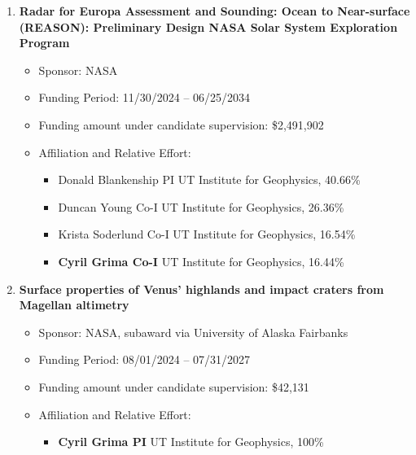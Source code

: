 \begin{enumerate}[leftmargin=2.5em, labelsep=1.5em, label=UR\arabic*]

    \item
        \textbf{Radar for Europa Assessment and Sounding: Ocean to Near-surface (REASON): Preliminary Design NASA Solar System Exploration Program}
        \begin{itemize}[leftmargin=0em, labelsep=1em, topsep=-.5em, itemsep=-.2em]
            \item Sponsor: NASA
            \item Funding Period: 11/30/2024 – 06/25/2034
            \item Funding amount under candidate supervision: \$2,491,902
            \item Affiliation and Relative Effort:
            \TabPositions{4cm, 5.5cm}
            \begin{itemize}[leftmargin=2em, labelsep=1em, topsep=-.5em, itemsep=-.2em]
                \item Donald Blankenship \tab PI \tab UT Institute for Geophysics, 40.66\%
                \item Duncan Young \tab Co-I \tab  UT Institute for Geophysics, 26.36\%
                \item Krista Soderlund \tab Co-I \tab  UT Institute for Geophysics, 16.54\% 
                \item \textbf{Cyril Grima \tab Co-I} \tab  UT Institute for Geophysics, 16.44\%
            \end{itemize}
        \end{itemize}

    \item
        \textbf{Surface properties of Venus' highlands and impact craters from Magellan altimetry}
        \begin{itemize}[leftmargin=0em, labelsep=1em, topsep=-.5em, itemsep=-.2em]
            \item Sponsor: NASA, subaward via University of Alaska Fairbanks
            \item Funding Period: 08/01/2024 – 07/31/2027
            \item Funding amount under candidate supervision: \$42,131
            \item Affiliation and Relative Effort:
            \TabPositions{4cm, 5.5cm}
            \begin{itemize}[leftmargin=2em, labelsep=1em, topsep=-.5em, itemsep=-.2em]
                \item \textbf{Cyril Grima \tab PI} \tab  UT Institute for Geophysics, 100\%
            \end{itemize}
        \end{itemize}


\end{enumerate}
